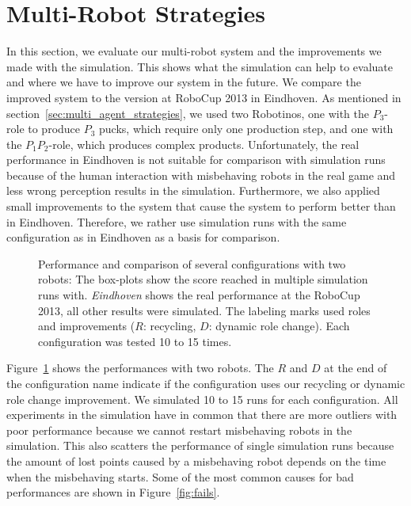\section{Multi-Robot Strategies}
\label{sec:multi_robot_strategies}
In this section, we evaluate our multi-robot system and the improvements we made with the simulation. This shows what the simulation can help to evaluate and where we have to improve our system in the future. We compare the improved system to the version at RoboCup 2013 in Eindhoven. As mentioned in section~\ref{sec:multi_agent_strategies}, we used two Robotinos, one with the $P_3$-role to produce $P_3$ pucks, which require only one production step, and one with the $P_1P_2$-role, which produces complex products. Unfortunately, the real performance in Eindhoven is not suitable for comparison with simulation runs because of the human interaction with misbehaving robots in the real game and less wrong perception results in the simulation. Furthermore, we also applied small improvements to the system that cause the system to perform better than in Eindhoven. Therefore, we rather use simulation runs with the same configuration as in Eindhoven as a basis for comparison.
\begin{figure}
  \centering
  \caption[Performance and comparison of several configurations with two robots]{Performance and comparison of several configurations with two robots: The box-plots show the score reached in multiple simulation runs with. \textit{Eindhoven} shows the real performance at the RoboCup 2013, all other results were simulated. The labeling marks used roles and improvements ($R$: recycling, $D$: dynamic role change). Each configuration was tested 10 to 15 times.}
  \label{fig:eval_two}
\end{figure}
Figure~\ref{fig:eval_two} shows the performances with two robots. The $R$ and $D$ at the end of the configuration name indicate if the configuration uses our recycling or dynamic role change improvement. We simulated 10 to 15 runs for each configuration. All experiments in the simulation have in common that there are more outliers with poor performance because we cannot restart misbehaving robots in the simulation. This also scatters the performance of single simulation runs because the amount of lost points caused by a misbehaving robot depends on the time when the misbehaving starts. Some of the most common causes for bad performances are shown in Figure~\ref{fig:fails}.

